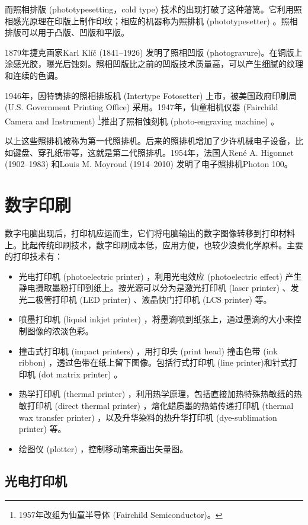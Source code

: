 而照相排版 (phototypesetting，cold type) 技术的出现打破了这种藩篱。它利用照相感光原理在印版上制作印纹；相应的机器称为照排机 (phototypesetter) 。照相排版可以用于凸版、凹版和平版。

1879年捷克画家Karl Klíč (1841--1926)\indexKlic{} 发明了照相凹版 (photogravure)。在铜版上涂感光胶，曝光后蚀刻。照相凹版比之前的凹版技术质量高，可以产生细腻的纹理和连续的色调。

1946年，因特铸排的照相排版机 (Intertype Fotosetter) 上市，被美国政府印刷局 (U.S. Government Printing Office) 采用。1947年，仙童相机仪器 (Fairchild Camera and Instrument)\indexFairchild{} \footnote{1957年改组为仙童半导体 (Fairchild Semiconductor)。}推出了照相蚀刻机 (photo-engraving machine) 。

以上这些照排机被称为第一代照排机。后来的照排机增加了少许机械电子设备，比如键盘、穿孔纸带等，这就是第二代照排机。1954年，法国人René A. Higonnet (1902--1983)\indexHigonnet{} 和Louis M. Moyroud (1914--2010)\indexMoyroud{} 发明了电子照排机Photon 100。

\section{数字印刷}
数字电脑出现后，打印机应运而生，它们将电脑输出的数字图像转移到打印材料上。比起传统印刷技术，数字印刷成本低，应用方便，也较少浪费化学原料。主要的打印技术有：

\begin{itemize}
    \item 光电打印机 (photoelectric printer) ，利用光电效应 (photoelectric effect) 产生静电摄取墨粉打印到纸上。按光源可以分为是激光打印机 (laser printer) 、发光二极管打印机 (LED printer) 、液晶快门打印机 (LCS printer) 等。
    \item 喷墨打印机 (liquid inkjet printer) ，将墨滴喷到纸张上，通过墨滴的大小来控制图像的浓淡色彩。
    \item 撞击式打印机 (impact printers) ，用打印头 (print head) 撞击色带 (ink ribbon) ，透过色带在纸上留下图像。包括行式打印机 (line printer)和针式打印机 (dot matrix printer) 。
    \item 热学打印机 (thermal printer) ，利用热学原理，包括直接加热特殊热敏纸的热敏打印机 (direct thermal printer) ，熔化蜡质墨的热蜡传递打印机 (thermal wax transfer printer) ，以及升华染料的热升华打印机 (dye-sublimation printer) 等。
    \item 绘图仪 (plotter) ，控制移动笔来画出矢量图。
\end{itemize}

\subsection{光电打印机}

